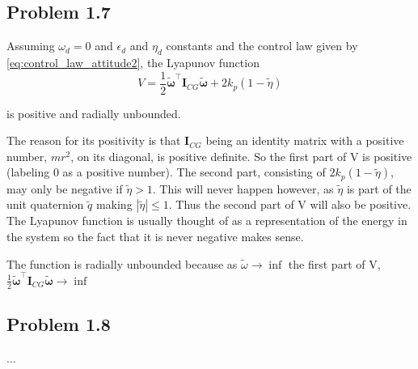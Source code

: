 \subsection*{Problem 1.7}
Assuming $\omega_d = 0$ and $\epsilon_d$ and $\eta_d$ constants and the control law given by \eqref{eq:control_law_attitude2}, the Lyapunov function 
 \begin{equation}
	 V = \frac{1}{2} \tilde{\boldsymbol{\omega}}^{\top} \mathbf{I}_{CG}\tilde{\boldsymbol{\omega}} + 2 k_p (1-\tilde{\eta})
 \end{equation}
 
is positive and radially unbounded. 

The reason for its positivity is that $\mathbf{I}_{CG}$ being an identity matrix with a positive number, $mr^2$, on its diagonal, is positive definite. So the first part of V is positive (labeling 0 as a positive number). The second part, consisting of $2 k_p (1-\tilde{\eta})$, may only be negative if $\tilde{\eta} > 1$. This will never happen however, as $\tilde{\eta}$ is part of the unit quaternion $\tilde{q}$ making $|\tilde{\eta}| \leq 1$. Thus the second part of V will also be positive. The Lyapunov function is usually thought of as a representation of the energy in the system so the fact that it is never negative makes sense. 

The function is radially unbounded because as $\tilde{\omega}\rightarrow \inf$ the first part of V, $\frac{1}{2} \tilde{\boldsymbol{\omega}}^{\top} \mathbf{I}_{CG}\tilde{\boldsymbol{\omega}} \rightarrow \inf$

\subsection*{Problem 1.8}
...


